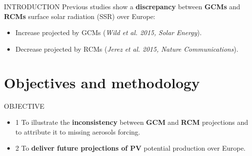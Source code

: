\documentclass{beamer}%
\begin{document}
\begin{frame}[fragile]{INTRODUCTION}
\Large{}
\vspace{1\baselineskip}
\small{Previous studies show a \textbf{discrepancy} between \textbf{GCMs} and \textbf{RCMs} surface solar radiation (SSR) over Europe:\\}
\begin{itemize}
     \item \alert{Increase} projected by GCMs {\tiny(\textit{Wild et al. 2015, Solar Energy})}.
     \item \alert{Decrease} projected by RCMs {\tiny(\textit{Jerez et al. 2015, Nature Communications})}.
     \end{itemize}
\end{frame}

\section{Objectives and methodology}

\begin{frame}[fragile]{OBJECTIVE}
  \begin{itemize}
  \item {\Huge{\alert{1}}} To illustrate the \textbf{inconsistency} between \textbf{GCM} and \textbf{RCM} projections and to attribute it to missing aerosols forcing. 
    \vspace{1.5\baselineskip}
    \item {\Huge{\alert{2}}} To \textbf{deliver future projections of PV} potential production over Europe.
    \end{itemize}
\end{frame}
\end{document}
